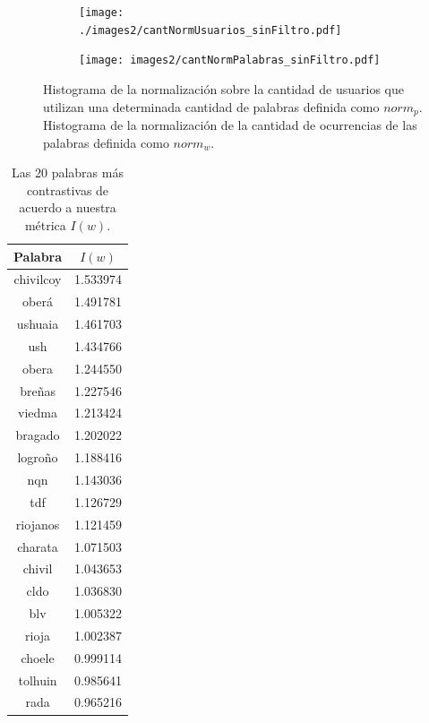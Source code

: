 \begin{figure}[!ht]\centering
  \begin{subfigure}[t]{0.49\textwidth}
    \texttt{[image: ./images2/cantNormUsuarios\_sinFiltro.pdf]}
    \caption{} 
    \label{fig:cantNormUsuarios} 
   \end{subfigure}
   \begin{subfigure}[t]{0.49\textwidth}
    \texttt{[image: images2/cantNormPalabras\_sinFiltro.pdf]}
    \caption{} 
    \label{fig:cantNormPalabras} 
   \end{subfigure}
   \caption{ Histograma de la normalización sobre la cantidad de usuarios que utilizan una determinada cantidad de palabras definida como $norm_p$.  Histograma de la normalización de la cantidad de ocurrencias de las palabras definida como $norm_w$.}
   \label{fig:cantNormFig}
\end{figure}



\begin{table}[ht]
\centering
\begin{tabular}{@{}cc@{}}
\toprule
Palabra   & $I(w)$     \\ \midrule
chivilcoy & 1.533974 \\
oberá     & 1.491781 \\
ushuaia   & 1.461703 \\
ush       & 1.434766 \\
obera     & 1.244550 \\
breñas    & 1.227546 \\
viedma    & 1.213424 \\
bragado   & 1.202022 \\
logroño   & 1.188416 \\
nqn       & 1.143036 \\
tdf       & 1.126729 \\
riojanos  & 1.121459 \\
charata   & 1.071503 \\
chivil    & 1.043653 \\
cldo      & 1.036830 \\
blv       & 1.005322 \\
rioja     & 1.002387 \\
choele    & 0.999114 \\
tolhuin   & 0.985641 \\
rada      & 0.965216 \\ \bottomrule
\end{tabular}
\caption{Las 20 palabras más contrastivas de acuerdo a nuestra métrica $I(w)$.}
\label{tab:palabras_ivalue}
\end{table}

